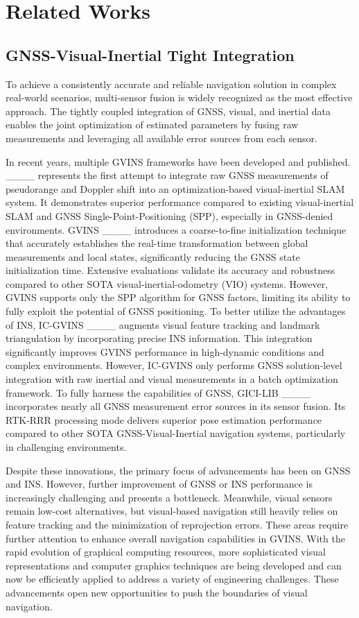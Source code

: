 \section{Related Works}
\subsection{GNSS-Visual-Inertial Tight Integration}
To achieve a consistently accurate and reliable navigation solution in complex real-world scenarios, multi-sensor fusion is widely recognized as the most effective approach. The tightly coupled integration of GNSS, visual, and inertial data enables the joint optimization of estimated parameters by fusing raw measurements and leveraging all available error sources from each sensor.

In recent years, multiple GVINS frameworks have been developed and published. ____ represents the first attempt to integrate raw GNSS measurements of pseudorange and Doppler shift into an optimization-based visual-inertial SLAM system. It demonstrates superior performance compared to existing visual-inertial SLAM and GNSS Single-Point-Positioning (SPP), especially in GNSS-denied environments. GVINS ____ introduces a coarse-to-fine initialization technique that accurately establishes the real-time transformation between global measurements and local states, significantly reducing the GNSS state initialization time. Extensive evaluations validate its accuracy and robustness compared to other SOTA visual-inertial-odometry (VIO) systems. However, GVINS supports only the SPP algorithm for GNSS factors, limiting its ability to fully exploit the potential of GNSS positioning. To better utilize the advantages of INS, IC-GVINS ____ augments visual feature tracking and landmark triangulation by incorporating precise INS information. This integration significantly improves GVINS performance in high-dynamic conditions and complex environments. However, IC-GVINS only performs GNSS solution-level integration with raw inertial and visual measurements in a batch optimization framework. To fully harness the capabilities of GNSS, GICI-LIB ____ incorporates nearly all GNSS measurement error sources in its sensor fusion. Its RTK-RRR processing mode delivers superior pose estimation performance compared to other SOTA GNSS-Visual-Inertial navigation systems, particularly in challenging environments.

Despite these innovations, the primary focus of advancements has been on GNSS and INS. However, further improvement of GNSS or INS performance is increasingly challenging and presents a bottleneck. Meanwhile, visual sensors remain low-cost alternatives, but visual-based navigation still heavily relies on feature tracking and the minimization of reprojection errors. These areas require further attention to enhance overall navigation capabilities in GVINS. With the rapid evolution of graphical computing resources, more sophisticated visual representations and computer graphics techniques are being developed and can now be efficiently applied to address a variety of engineering challenges. These advancements open new opportunities to push the boundaries of visual navigation.      





